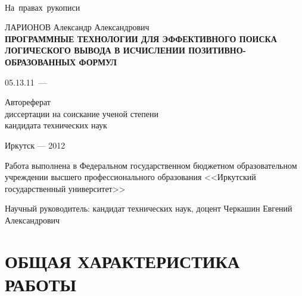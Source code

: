\documentclass[a4paper]{report}
\begin{document}
\begin{titlepage}
\mbox{~}\\{}
\vfill{}
\hfill{\vbox{\hbox{На правах рукописи}}}
\vspace{1cm}\vfill
\begin{center}
    ЛАРИОНОВ Александр Александрович \\
    \vspace{0.5cm}
\bf ПРОГРАММНЫЕ ТЕХНОЛОГИИ ДЛЯ ЭФФЕКТИВНОГО ПОИСКА ЛОГИЧЕСКОГО ВЫВОДА В ИСЧИСЛЕНИИ ПОЗИТИВНО-ОБРАЗОВАННЫХ ФОРМУЛ
\end{center}
\vfill
\hfil\hbox{\hbox{05.13.11 --- }
    \hbox{}%
}\hfil
\vspace{1cm}
\begin{center}
    Автореферат \\
    диссертации на соискание ученой степени \\
    кандидата технических наук
\end{center}
\vfill
\vfill
\begin{center}
{Иркутск --- 2012}
\end{center}
\end{titlepage}

%
\def\namepc{\hbox{$\rm\mu{}$PrISM}}

\newpage

Работа выполнена в Федеральном государственном бюджетном образовательном учреждении высшего профессионального образования <<Иркутский государственный университет>>

Научный руководитель: кандидат технических наук, доцент Черкашин Евгений Александрович


\newpage

\section*{ОБЩАЯ ХАРАКТЕРИСТИКА РАБОТЫ}
\end{document}
